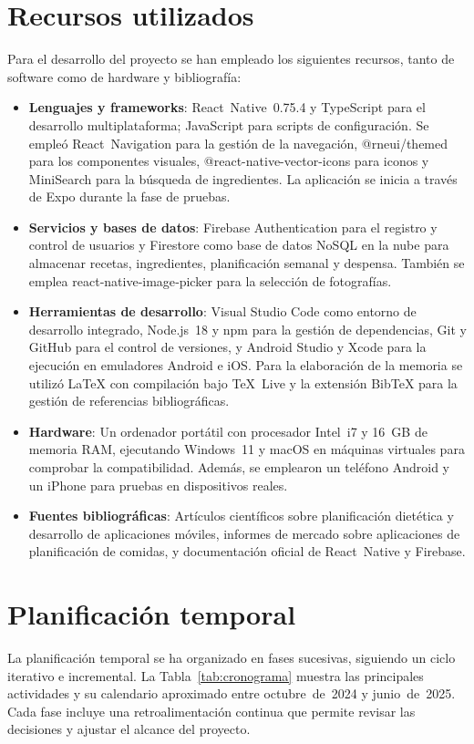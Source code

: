 \documentclass[twoside, openright, 11pt]{report}
\begin{document}
\section{Recursos utilizados}
\label{sec.recursos}
Para el desarrollo del proyecto se han empleado los siguientes recursos, tanto de software como de hardware y bibliografía:

\begin{itemize}
  \item \textbf{Lenguajes y frameworks}: React Native 0.75.4 y TypeScript para el desarrollo multiplataforma; JavaScript para scripts de configuración. Se empleó React Navigation para la gestión de la navegación, @rneui/themed para los componentes visuales, @react-native-vector-icons para iconos y MiniSearch para la búsqueda de ingredientes. La aplicación se inicia a través de Expo durante la fase de pruebas.
  \item \textbf{Servicios y bases de datos}: Firebase Authentication para el registro y control de usuarios y Firestore como base de datos NoSQL en la nube para almacenar recetas, ingredientes, planificación semanal y despensa. También se emplea react‑native‑image‑picker para la selección de fotografías.
  \item \textbf{Herramientas de desarrollo}: Visual Studio Code como entorno de desarrollo integrado, Node.js 18 y npm para la gestión de dependencias, Git y GitHub para el control de versiones, y Android Studio y Xcode para la ejecución en emuladores Android e iOS. Para la elaboración de la memoria se utilizó LaTeX con compilación bajo TeX Live y la extensión BibTeX para la gestión de referencias bibliográficas.
  \item \textbf{Hardware}: Un ordenador portátil con procesador Intel i7 y 16 GB de memoria RAM, ejecutando Windows 11 y macOS en máquinas virtuales para comprobar la compatibilidad. Además, se emplearon un teléfono Android y un iPhone para pruebas en dispositivos reales.
  \item \textbf{Fuentes bibliográficas}: Artículos científicos sobre planificación dietética y desarrollo de aplicaciones móviles\cite{NLMMealPlanningBenefits, NLMDifficultyEatingHealthy, Lim2025CuestionarioUsabilidad}, informes de mercado sobre aplicaciones de planificación de comidas\cite{businessresearchinsights2024, mckinsey2023}, y documentación oficial de React Native y Firebase.
\end{itemize}

\section{Planificación temporal}
\label{sec.planificacion}
La planificación temporal se ha organizado en fases sucesivas, siguiendo un ciclo iterativo e incremental. La Tabla~\ref{tab:cronograma} muestra las principales actividades y su calendario aproximado entre octubre de 2024 y junio de 2025. Cada fase incluye una retroalimentación continua que permite revisar las decisiones y ajustar el alcance del proyecto.
\end{document}
